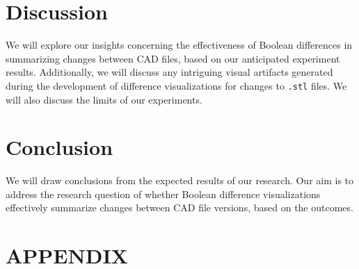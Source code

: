 \documentclass[sigconf,authorversion,nonacm]{acmart}
\begin{document}
\section{Discussion}

We will explore our insights concerning the effectiveness of Boolean differences in summarizing changes between CAD files, based on our anticipated experiment results. Additionally, we will discuss any intriguing visual artifacts generated during the development of difference visualizations for changes to \texttt{.stl} files. We will also discuss the limits of our experiments.

\section{Conclusion}
We will draw conclusions from the expected results of our research. Our aim is to address the research question of whether Boolean difference visualizations effectively summarize changes between CAD file versions, based on the outcomes.


\appendix
\section*{APPENDIX}
\end{document}
